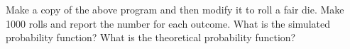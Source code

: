 Make a copy of the above program and then modify it to roll
a fair die.
Make 1000 rolls and report the number for each outcome.
What is the simulated probability function?
What is the theoretical probability function?
